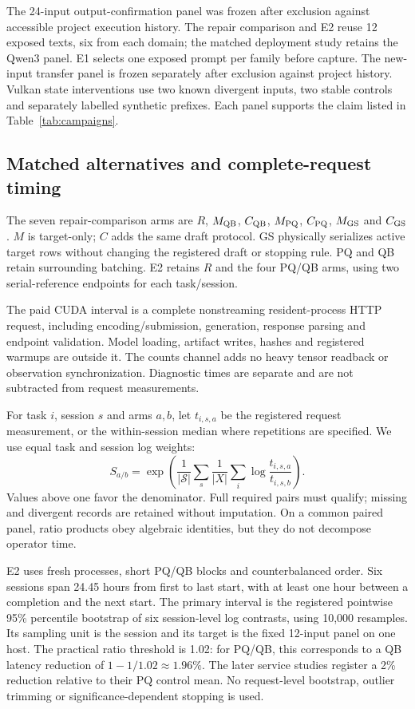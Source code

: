 The 24-input output-confirmation panel was frozen after exclusion against accessible project execution history. The repair comparison and E2 reuse 12 exposed texts, six from each domain; the matched deployment study retains the Qwen3 panel. E1 selects one exposed prompt per family before capture. The new-input transfer panel is frozen separately after exclusion against project history. Vulkan state interventions use two known divergent inputs, two stable controls and separately labelled synthetic prefixes. Each panel supports the claim listed in Table~\ref{tab:campaigns}.

\subsection{Matched alternatives and complete-request timing}
The seven repair-comparison arms are $R$, $M_{\mathrm{QB}}$, $C_{\mathrm{QB}}$, $M_{\mathrm{PQ}}$, $C_{\mathrm{PQ}}$, $M_{\mathrm{GS}}$ and $C_{\mathrm{GS}}$. $M$ is target-only; $C$ adds the same draft protocol. GS physically serializes active target rows without changing the registered draft or stopping rule. PQ and QB retain surrounding batching. E2 retains $R$ and the four PQ/QB arms, using two serial-reference endpoints for each task/session.

The paid CUDA interval is a complete nonstreaming resident-process HTTP request, including encoding/submission, generation, response parsing and endpoint validation. Model loading, artifact writes, hashes and registered warmups are outside it. The counts channel adds no heavy tensor readback or observation synchronization. Diagnostic times are separate and are not subtracted from request measurements.

For task $i$, session $s$ and arms $a,b$, let $t_{i,s,a}$ be the registered request measurement, or the within-session median where repetitions are specified. We use equal task and session log weights:
\begin{equation}
S_{a/b}=\exp\!\left(\frac{1}{|\mathcal S|}\sum_s\frac{1}{|X|}\sum_i\log\frac{t_{i,s,a}}{t_{i,s,b}}\right).
\label{eq:ratio}
\end{equation}
Values above one favor the denominator. Full required pairs must qualify; missing and divergent records are retained without imputation. On a common paired panel, ratio products obey algebraic identities, but they do not decompose operator time.

E2 uses fresh processes, short PQ/QB blocks and counterbalanced order. Six sessions span 24.45 hours from first to last start, with at least one hour between a completion and the next start. The primary interval is the registered pointwise 95\% percentile bootstrap of six session-level log contrasts, using 10,000 resamples. Its sampling unit is the session and its target is the fixed 12-input panel on one host. The practical ratio threshold is 1.02: for PQ/QB, this corresponds to a QB latency reduction of $1-1/1.02\approx1.96\%$. The later service studies register a 2\% reduction relative to their PQ control mean. No request-level bootstrap, outlier trimming or significance-dependent stopping is used.

